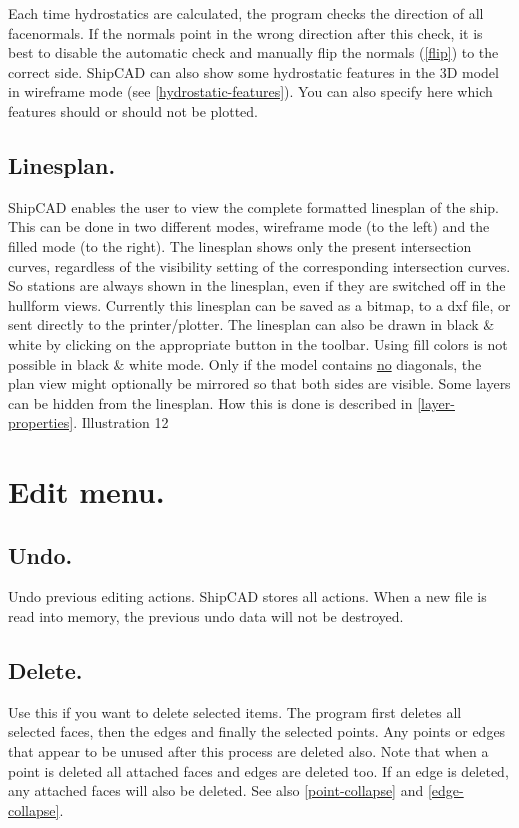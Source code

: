 \documentclass[12pt]{article}
\begin{document}
Each time hydrostatics are calculated, the program checks the
direction of all facenormals. If the normals point in the wrong
direction after this check, it is best to disable the automatic check
and manually flip the normals (\ref{flip}) to the correct side.  ShipCAD
can also show some hydrostatic features in the 3D model in wireframe
mode (see \ref{hydrostatic-features}). You can also specify here which
features should or should not be plotted.

\subsection{Linesplan.}
ShipCAD enables the user to view the complete formatted linesplan of
the ship. This can be done in two different modes, wireframe mode (to
the left) and the filled mode (to the right). The linesplan shows only
the present intersection curves, regardless of the visibility setting
of the corresponding intersection curves. So stations are always shown
in the linesplan, even if they are switched off in the hullform
views. Currently this linesplan can be saved as a bitmap, to a dxf
file, or sent directly to the printer/plotter. The linesplan can also
be drawn in black \& white by clicking on the appropriate button in
the toolbar. Using fill colors is not possible in black \& white
mode. Only if the model contains \underline{no} diagonals, the plan view might
optionally be mirrored so that both sides are visible.  Some layers
can be hidden from the linesplan. How this is done is described in
\ref{layer-properties}.
Illustration 12

\section{Edit menu.}

\subsection{Undo.}
Undo previous editing actions. ShipCAD stores all actions. When a new
file is read into memory, the previous undo data will not be
destroyed.

\subsection{Delete.}
Use this if you want to delete selected items. The program first
deletes all selected faces, then the edges and finally the selected
points. Any points or edges that appear to be unused after this
process are deleted also. Note that when a point is deleted all
attached faces and edges are deleted too. If an edge is deleted, any
attached faces will also be deleted. See also \ref{point-collapse}
and \ref{edge-collapse}.
\end{document}
